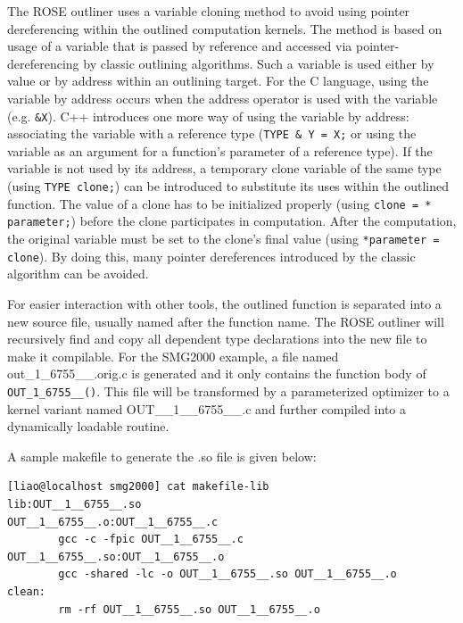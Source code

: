 The ROSE outliner uses a variable cloning method to
avoid using pointer dereferencing within the outlined computation kernels. 
The method is based on usage of a variable that is passed by reference and
accessed
via pointer-dereferencing by classic outlining algorithms.
Such a variable is used either by value or by address within an outlining
target.
For the C language, using the variable by address occurs when the
address operator
is used with the variable (e.g. \lstinline{&X}).
C++ introduces one more way of using the variable by address:
associating the variable with a reference type
(\lstinline{TYPE & Y = X;} or using the variable as an argument for a
 function's parameter of a reference type).
If the variable is not used by its address,
a temporary clone variable of the same type (using \lstinline{TYPE clone;})
can be introduced to substitute its uses within the outlined function.
The value of a clone has to be
initialized properly (using \lstinline{clone = * parameter;})
before the clone participates in computation.
After the computation, the original variable must be set to the clone's
final value
(using \lstinline{*parameter = clone}).
By doing this, many pointer dereferences introduced by the classic
algorithm can be avoided.

For easier interaction with other tools, the outlined function is separated
into a new source file, usually named after 
the function name.  
The ROSE outliner will recursively find and copy all dependent type declarations
into the new file to make it compilable.
For the SMG2000 example, a file named out\_1\_6755\_\_.orig.c 
is generated and it only contains the function body of \lstinline{OUT_1_6755__()}. 
This file will be transformed by a parameterized optimizer to a kernel
variant named OUT\_\_1\_\_6755\_\_.c and further compiled into a dynamically
loadable routine.

A sample makefile to generate the .so file is given below: 

{\mySmallFontSize
\begin{verbatim}
[liao@localhost smg2000] cat makefile-lib
lib:OUT__1__6755__.so
OUT__1__6755__.o:OUT__1__6755__.c
        gcc -c -fpic OUT__1__6755__.c
OUT__1__6755__.so:OUT__1__6755__.o
        gcc -shared -lc -o OUT__1__6755__.so OUT__1__6755__.o
clean:
        rm -rf OUT__1__6755__.so OUT__1__6755__.o
\end{verbatim}
}


